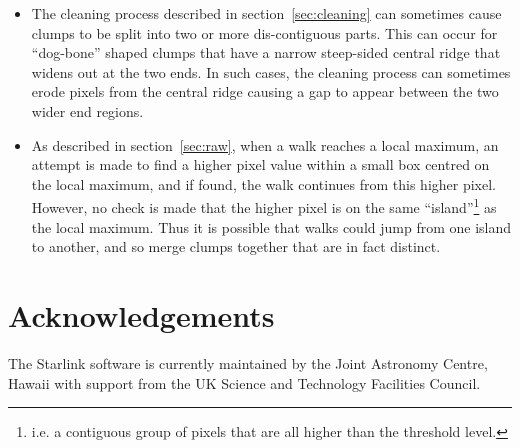 \documentclass[final,authoryear,5p,times,twocolumn]{elsarticle}
\begin{document}
\begin{itemize}
\item The cleaning process described in section~\ref{sec:cleaning} can
sometimes cause clumps to be split into two or more dis-contiguous parts.
This can occur for ``dog-bone'' shaped clumps that have a narrow
steep-sided central ridge that widens out at the two ends. In such cases,
the cleaning process can sometimes erode pixels from the central ridge
causing a gap to appear between the two wider end regions.

\item As described in section~\ref{sec:raw}, when a walk reaches a local
maximum, an attempt is made to find a higher pixel value within a small
box centred on the local maximum, and if found, the walk continues from this
higher pixel. However, no check is made that the higher pixel is on the
same ``island''\footnote{i.e. a contiguous group of
pixels that are all higher than the threshold level.} as the local
maximum. Thus it is possible that walks could jump from one island to
another, and so merge clumps together that are in fact distinct.
\end{itemize}

\section{Acknowledgements}

The Starlink software is currently maintained by the Joint Astronomy
Centre, Hawaii with support from the UK Science and Technology
Facilities Council.



\end{document}
